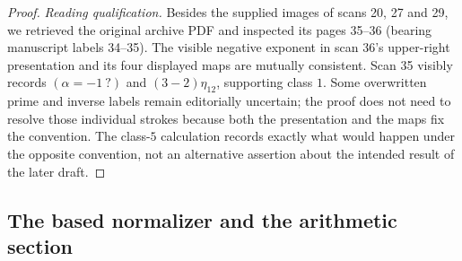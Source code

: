 \begin{proof}
\emph{Reading qualification.}  Besides the supplied images of scans
20, 27 and 29, we retrieved the original archive PDF and inspected
its pages 35--36 (bearing manuscript labels 34--35).
The visible negative exponent in scan 36's upper-right presentation
and its four displayed maps are mutually consistent.  Scan 35
visibly records $(\alpha=-1\ ?)$ and $(3-2)\eta_{12}$, supporting
class $1$.  Some overwritten prime and inverse labels remain
editorially uncertain; the proof does not need to resolve those
individual strokes because both the presentation and the maps fix
the convention.  The class-$5$ calculation records exactly what
would happen under the opposite convention, not an alternative
assertion about the intended result of the later draft.
\end{proof}

\subsection{The based normalizer and the arithmetic section}

